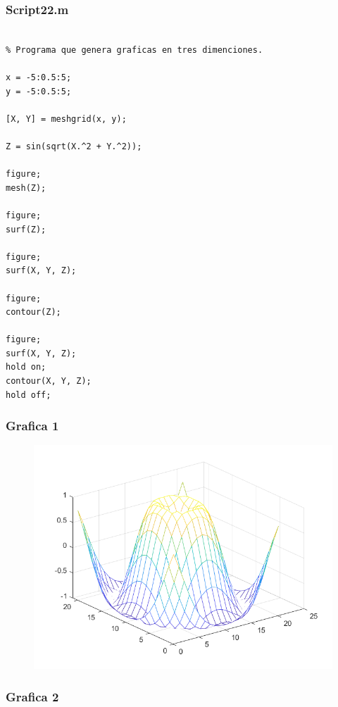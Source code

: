 \documentclass{article}
\begin{document}
	\subsubsection{Script22.m}
	
	\begin{lstlisting}

% Programa que genera graficas en tres dimenciones.

x = -5:0.5:5;
y = -5:0.5:5;

[X, Y] = meshgrid(x, y);

Z = sin(sqrt(X.^2 + Y.^2));

figure;
mesh(Z);

figure;
surf(Z);

figure;
surf(X, Y, Z);

figure;
contour(Z);

figure;
surf(X, Y, Z);
hold on;
contour(X, Y, Z);
hold off;

	\end{lstlisting}
	
	\newpage
	
	\subsubsection{Grafica 1}
	
	\begin{figure}[h]
		\centering
		\includegraphics[width=\textwidth]{grafica22a.png}
	\end{figure}
	
	\newpage
	
	\subsubsection{Grafica 2}
	
\end{document}
